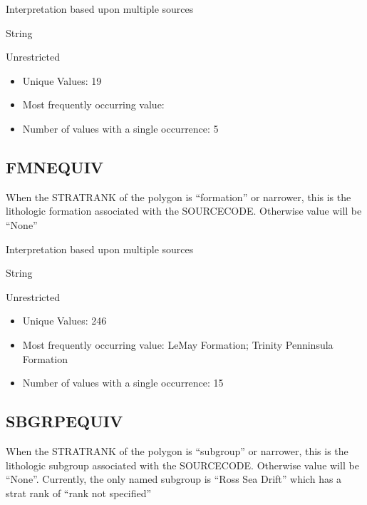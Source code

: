 \documentclass[letterpaper,10pt,english]{sphinxmanual}
\begin{document}
Interpretation based upon multiple sources

String


Unrestricted

\begin{itemize}
\item {} 
Unique Values: 19

\item {} 
Most frequently occurring value:

\item {} 
Number of values with a single occurrence: 5

\end{itemize}


\subsection{FMNEQUIV}
\label{\detokenize{field_glossary:fmnequiv}}
When the STRATRANK of the polygon is “formation” or narrower, this is the lithologic formation associated with the SOURCECODE. Otherwise value will be “None”

Interpretation based upon multiple sources

String


Unrestricted

\begin{itemize}
\item {} 
Unique Values: 246

\item {} 
Most frequently occurring value: LeMay Formation; Trinity Penninsula Formation

\item {} 
Number of values with a single occurrence: 15

\end{itemize}


\subsection{SBGRPEQUIV}
\label{\detokenize{field_glossary:sbgrpequiv}}
When the STRATRANK of the polygon is “subgroup” or narrower, this is the lithologic subgroup associated with the SOURCECODE. Otherwise value will be “None”. Currently, the only named subgroup is “Ross Sea Drift” which has a strat rank of “rank not specified”
\end{document}
